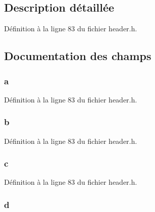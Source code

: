 \subsection{Description détaillée}


Définition à la ligne 83 du fichier header.\-h.



\subsection{Documentation des champs}
\hypertarget{structt__skill__list_a39a494bb9ce01ba13ea4577fe2b1cc79}{
\subsubsection[{a}]{ a}}\label{structt__skill__list_a39a494bb9ce01ba13ea4577fe2b1cc79}


Définition à la ligne 83 du fichier header.\-h.

\hypertarget{structt__skill__list_a85ae40dbaecefd131b936ec65e9f4809}{
\subsubsection[{b}]{ b}}\label{structt__skill__list_a85ae40dbaecefd131b936ec65e9f4809}


Définition à la ligne 83 du fichier header.\-h.

\hypertarget{structt__skill__list_ac9055dd2d5c45c223e3b0e1920c31493}{
\subsubsection[{c}]{ c}}\label{structt__skill__list_ac9055dd2d5c45c223e3b0e1920c31493}


Définition à la ligne 83 du fichier header.\-h.

\hypertarget{structt__skill__list_a0bb2c4a26ff65aecd7a36ad7ee898cd8}{
\subsubsection[{d}]{ d}}\label{structt__skill__list_a0bb2c4a26ff65aecd7a36ad7ee898cd8}


